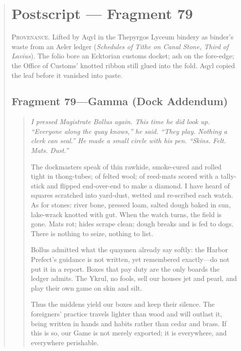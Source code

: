 \documentclass[11pt]{article}
\begin{document}
\begin{quote}
\section*{Postscript — Fragment 79}
\label{sec:postscript}

\medskip
\noindent\small\textsc{Provenance.} Lifted by Aqyl in the Thepyrgos Lyceum bindery as binder’s waste from an Aeler ledger (\emph{Schedules of Tithe on Canal Stone, Third of Lavius}). The folio bore an Ecktorian customs docket; ash on the fore-edge; the Office of Customs’ knotted ribbon still glued into the fold. Aqyl copied the leaf before it vanished into paste.\normalsize

\medskip
\subsection*{Fragment 79—Gamma (Dock Addendum)}
\begin{quote}\small\itshape
\noindent I pressed Magistrate Bollus again. This time he did look up. “Everyone along the quay knows,” he said. “They play. Nothing a clerk can seal.” He made a small circle with his pen. “Skins. Felt. Mats. Dust.”

\medskip
\noindent The dockmasters speak of thin rawhide, smoke-cured and rolled tight in thong-tubes; of felted wool; of reed-mats scored with a tally-stick and flipped end-over-end to make a diamond. I have heard of squares scratched into yard-dust, wetted and re-scribed each watch. As for stones: river bone, pressed loam, salted dough baked in sun, lake-wrack knotted with gut. When the watch turns, the field is gone. Mats rot; hides scrape clean; dough breaks and is fed to dogs. There is nothing to seize, nothing to list.

\medskip
\noindent Bollus admitted what the quaymen already say softly: the Harbor Prefect’s guidance is not written, yet remembered exactly—do not put it in a report. Boxes that pay duty are the only boards the ledger admits. The Ykrul, no fools, sell our houses jet and pearl, and play their own game on skin and silt.

\medskip
\noindent Thus the middens yield our boxes and keep their silence. The foreigners’ practice travels lighter than wood and will outlast it, being written in hands and habits rather than cedar and brass. If this is so, our Game is not merely exported; it is everywhere, and everywhere perishable.
\end{quote}


\end{quote}
\end{document}
